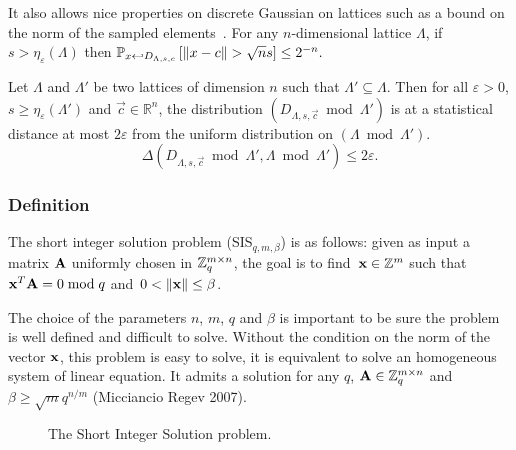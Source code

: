 It also allows nice properties on discrete Gaussian on lattices such as a bound on the norm of the sampled elements~\cite{MR04}.
For any $n$-dimensional lattice $\Lambda$, if $s > \eta_{\varepsilon}(\Lambda)$ then
$\mathbb{P}_{x \hookleftarrow D_{\Lambda,s,c}} \left[\Vert x-c \Vert > \sqrt{n} s \right] \leq 2^{-n}.$

\begin{lemma}
Let $\Lambda$ and $\Lambda'$ be two lattices of dimension $n$ such that $\Lambda' \subseteq \Lambda$. Then for all $\varepsilon >0$, $s \geq \eta_{\varepsilon}(\Lambda')$ and $\vec{c} \in \mathbb{R}^n$, the distribution $(D_{\Lambda,s,\vec{c}} \bmod \Lambda')$ is at a statistical distance at most $2 \varepsilon$ from the uniform distribution on $(\Lambda \bmod \Lambda')$.
$$ \Delta(D_{\Lambda,s,\vec{c}} \bmod \Lambda', \Lambda \bmod \Lambda') \leq 2 \varepsilon.$$
\end{lemma}

\subsubsection{Definition}

\begin{definition}
\label{def:SIS}
The short integer solution problem (SIS$_{q,m,\beta}$) is as follows: given as input a matrix $\bf A$ uniformly chosen in $\mathbb{Z}_q^{m \times n}$, the goal is to find~${\bf x} \in \mathbb{Z}^{m}$ such that ${\bf x}^T {\bf A} =  0 \bmod q$ and~$0 < \|{\bf x}\| \leq \beta $. 
\end{definition}

The choice of the parameters $n$, $m$, $q$ and $\beta$ is important to be sure the problem is well defined and difficult to solve. Without the condition on the norm of the vector $\bf x$, this problem is easy to solve, it is equivalent to solve an homogeneous system of linear equation.
It admits a solution for any $q$, ${\bf A} \in \mathbb{Z}_q^{m \times n}$ and $\beta \geq \sqrt{m} q^{n/m}$ (Micciancio Regev 2007).

\begin{figure}[h]
\begin{center}


\caption{The Short Integer Solution problem.}\label{fig:SIS}
\end{center}
\end{figure}

